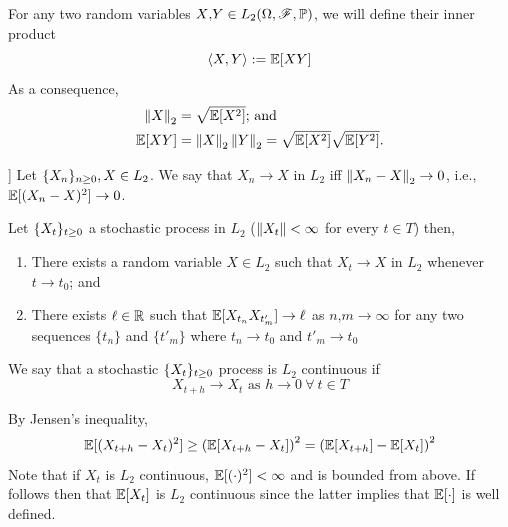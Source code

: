 \documentclass[../TGMAFFIRO]{subfiles}
\begin{document}
For any two random variables $X\text{,}Y\in L_2(\Omega, \mathscr{F}, \mathbb{P})$, we will define their inner product
\begin{equation}
	\langle X, Y\rangle := \mathbb{E}[XY]
\end{equation}
As a consequence,
\begin{align}
	\left\lVert X\right\rVert_2 &= \sqrt{\mathbb{E}[X^2]}\text{; and} \\
	\mathbb{E}[XY] &= \left\lVert X\right\rVert_2 \left\lVert Y\right\rVert_2 = \sqrt{\mathbb{E}[X^2]} \sqrt{\mathbb{E}[Y^2]}.
\end{align}

\begin{definition} ]
	Let $\{X_n\}_{n\geq 0}, X \in L_2$. We say that $X_n\to X$ in $L_2$ iff $\left\lVert X_n - X\right\rVert_2\to 0$, i.e., $\mathbb{E}[(X_n - X)^2] \to 0$.
\end{definition}

\begin{proposition}
	Let $\{X_t\}_{t\geq 0}$ a stochastic process in $L_2$ ($\left\lVert X_t\right\rVert < \infty$ for every $t\in T$) then,
	\begin{enumerate}
		\item There exists a random variable $X\in L_2$ such that $X_t \to X$ in $L_2$ whenever $t\to t_0$; and
		\item There exists $\ell \in \mathbb{R}$ such that $\mathbb{E}[X_{t_n}X_{t'_m}] \to \ell$ as $n\text{,}m \to \infty$ for any two sequences $\{t_n\}$ and $\{t'_m\}$ where $t_n \to t_0$ and $t'_m \to t_0$
	\end{enumerate}
\end{proposition}


\begin{definition}
We say that a stochastic $\{X_t\}_{t\geq 0}$ process is $L_2$ continuous if
	\begin{equation}
	  X_{t+h} \to X_t \text{ as } h\to 0 \ \forall \ t\in T 
	\end{equation}
\end{definition}

\begin{remark}
By Jensen's inequality,
	\begin{equation}
		\mathbb{E}[(X_{t+h} - X_{t})^2] \geq \left(\mathbb{E}[X_{t+h} - X_{t}]\right)^2	= \left(\mathbb{E}[X_{t+h}] - \mathbb{E}[X_{t}]\right)^2
	\end{equation}
Note that if $X_t$ is $L_2$ continuous, $\mathbb{E}[(\cdot)^2] < \infty$ and is bounded from above. If follows then that $\mathbb{E}[X_t]$ is $L_2$ continuous since the latter implies that $\mathbb{E}[\cdot]$ is well defined.
\end{remark}
\end{document}
